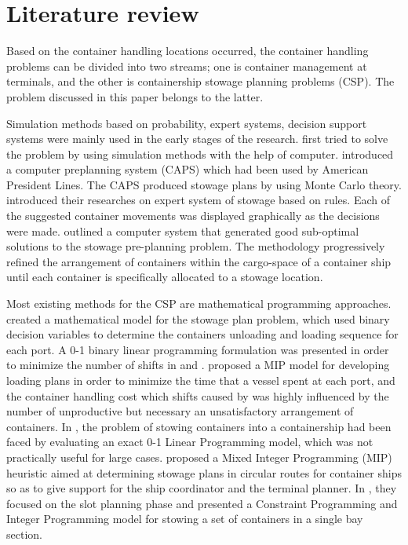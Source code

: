\documentclass[review,3p,times,authoryear,12pt]{elsarticle}
\begin{document}
\section{Literature review}
\label{sec:lr}
Based on the container handling locations occurred, the container handling problems can be divided into two streams; one is container management at terminals, and the other is containership stowage planning problems (CSP).
The problem discussed in this paper belongs to the latter.

Simulation methods based on probability, expert systems, decision support systems were mainly used in the early stages of the research.
\cite{webster1970container} first tried to solve the problem by using simulation methods with the help of computer.
\cite{shields1984containership} introduced a computer preplanning system (CAPS) which had been used by American President Lines.
The CAPS produced stowage plans by using Monte Carlo theory.
\cite{dillingham1986application} introduced their researches on expert system of stowage based on rules.
Each of the suggested container movements was displayed graphically as the decisions were made.
\cite{wilson2001container} outlined a computer system that generated good sub-optimal solutions to the stowage pre-planning problem.
The methodology progressively refined the arrangement of containers within the cargo-space of a container ship until each container is specifically allocated to a stowage location.

Most existing methods for the CSP are mathematical programming approaches.
\cite{botter1991stowage} created a mathematical model for the stowage plan problem, which used binary decision variables to determine the containers unloading and loading sequence for each port.
A 0-1 binary linear programming formulation was presented in order to minimize the number of shifts in \cite{avriel1998stowage} and \cite{avriel2000container}.
\cite{haghani2001model} proposed a MIP model for developing loading plans in order to minimize the time that a vessel spent at each port, and the container handling cost which shifts caused by was highly influenced by the number of unproductive but necessary an unsatisfactory arrangement of containers.
In \cite{ambrosino2004stowing}, the problem of stowing containers into a containership had been faced by evaluating an exact 0-1 Linear Programming model, which was not practically useful for large cases.
\cite{ambrosino2015mip} proposed a Mixed  Integer  Programming (MIP) heuristic aimed at determining stowage plans in circular routes for container ships so as to give support for the ship coordinator and the terminal planner.
In \cite{parreno2016grasp}, they focused on the slot planning phase and presented a Constraint Programming and Integer Programming model for stowing a set of containers in a single bay section.
\end{document}
